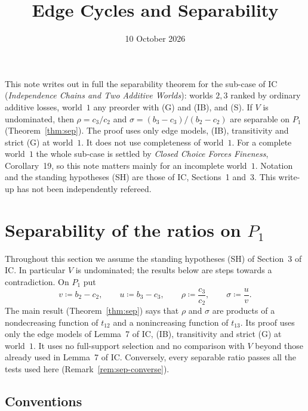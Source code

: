 \documentclass[11pt]{article}
\title{Edge Cycles and Separability}
\author{}\date{10 October 2026}
\theoremstyle{definition}\newtheorem{definition}[theorem]{Definition}
\theoremstyle{remark}\newtheorem{remark}[theorem]{Remark}
\begin{document}
\maketitle

\noindent
This note writes out in full the separability theorem for the sub-case of
IC (\emph{Independence Chains and Two Additive Worlds}): worlds $2,3$ ranked
by ordinary additive losses, world~$1$ any preorder with (G) and (IB), and
(S). If $V$ is undominated, then $\rho=c_3/c_2$ and
$\sigma=(b_3-c_3)/(b_2-c_2)$ are separable on $P_1$
(Theorem~\ref{thm:sep}). The proof uses only edge models, (IB), transitivity
and strict (G) at world~$1$. It does not use completeness of world~$1$.
For a complete world~$1$ the whole sub-case is settled by \emph{Closed Choice
Forces Fineness}, Corollary~19, so this note matters mainly for an
incomplete world~$1$. Notation and the standing hypotheses (SH) are those of
IC, Sections~1 and~3. This write-up has not been independently refereed.

\section{Separability of the ratios on $P_1$}\label{sec:sep}

Throughout this section we assume the standing hypotheses (SH) of
Section~3 of IC. In particular $V$ is undominated; the results below
are steps towards a contradiction. On $P_1$ put
\[
 v\coloneqq b_2-c_2,\qquad u\coloneqq b_3-c_3,\qquad
 \rho\coloneqq\frac{c_3}{c_2},\qquad \sigma\coloneqq\frac{u}{v}.
\]
The main result (Theorem~\ref{thm:sep}) says that $\rho$ and $\sigma$ are
products of a nondecreasing function of $t_{12}$ and a nonincreasing function
of $t_{13}$. Its proof uses only the edge models of Lemma~7 of IC,
(IB), transitivity and strict (G) at world~$1$. It uses no full-support
selection and no comparison with $V$ beyond those already used in
Lemma~7 of IC. Conversely, every separable ratio passes all the
tests used here (Remark~\ref{rem:sep-converse}).

\subsection{Conventions}
\end{document}
